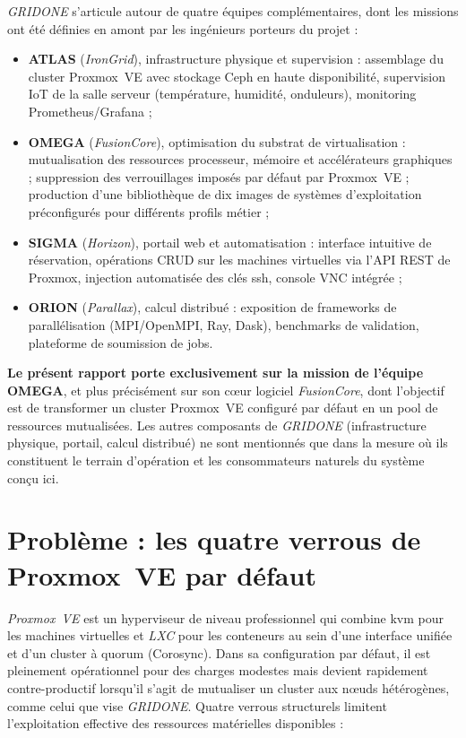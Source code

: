 \emph{GRIDONE} s'articule autour de quatre équipes complémentaires, dont les missions ont été définies en amont par les ingénieurs porteurs du projet :

\begin{itemize}[leftmargin=*]
    \item \textbf{ATLAS} (\emph{IronGrid}), infrastructure physique et supervision : assemblage du cluster Proxmox~VE avec stockage Ceph en haute disponibilité, supervision IoT de la salle serveur (température, humidité, onduleurs), monitoring Prometheus/Grafana ;
    \item \textbf{OMEGA} (\emph{FusionCore}), optimisation du substrat de virtualisation : mutualisation des ressources processeur, mémoire et accélérateurs graphiques ; suppression des verrouillages imposés par défaut par Proxmox~VE ; production d'une bibliothèque de dix images de systèmes d'exploitation préconfigurés pour différents profils métier ;
    \item \textbf{SIGMA} (\emph{Horizon}), portail web et automatisation : interface intuitive de réservation, opérations CRUD sur les machines virtuelles via l'API REST de Proxmox, injection automatisée des clés \acrshort{ssh}, console VNC intégrée ;
    \item \textbf{ORION} (\emph{Parallax}), calcul distribué : exposition de frameworks de parallélisation (MPI/OpenMPI, Ray, Dask), benchmarks de validation, plateforme de soumission de jobs.
\end{itemize}

\textbf{Le présent rapport porte exclusivement sur la mission de l'équipe OMEGA}, et plus précisément sur son cœur logiciel \emph{FusionCore}, dont l'objectif est de transformer un cluster Proxmox~VE configuré par défaut en un pool de ressources mutualisées. Les autres composants de \emph{GRIDONE} (infrastructure physique, portail, calcul distribué) ne sont mentionnés que dans la mesure où ils constituent le terrain d'opération et les consommateurs naturels du système conçu ici.

\section*{Problème : les quatre verrous de Proxmox~VE par défaut}

\emph{Proxmox~VE} est un hyperviseur de niveau professionnel qui combine \acrshort{kvm} pour les machines virtuelles et \emph{LXC} pour les conteneurs au sein d'une interface unifiée et d'un cluster à quorum (Corosync). Dans sa configuration par défaut, il est pleinement opérationnel pour des charges modestes mais devient rapidement contre-productif lorsqu'il s'agit de mutualiser un cluster aux nœuds hétérogènes, comme celui que vise \emph{GRIDONE}. Quatre verrous structurels limitent l'exploitation effective des ressources matérielles disponibles :

